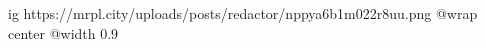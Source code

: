  
 
 
 
 

\ifcmt
  ig https://mrpl.city/uploads/posts/redactor/nppya6b1m022r8uu.png
  @wrap center
  @width 0.9
\fi
